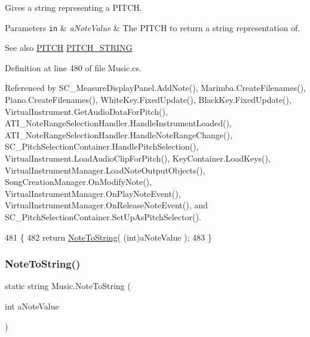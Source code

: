 Gives a string representing a P\+I\+T\+CH. 


\begin{DoxyParams}[1]{Parameters}
\mbox{\tt in}  & {\em a\+Note\+Value} & The P\+I\+T\+CH to return a string representation of.\\
\hline
\end{DoxyParams}
\begin{DoxySeeAlso}{See also}
\hyperlink{group___music_enums_ga508f69b199ea518f935486c990edac1d}{P\+I\+T\+CH} \hyperlink{group___music_constants_ga0f6eb5ac330d374c6b5021a0ba11c2bc}{P\+I\+T\+C\+H\+\_\+\+S\+T\+R\+I\+NG} 
\end{DoxySeeAlso}


Definition at line 480 of file Music.\+cs.



Referenced by S\+C\+\_\+\+Measure\+Display\+Panel.\+Add\+Note(), Marimba.\+Create\+Filenames(), Piano.\+Create\+Filenames(), White\+Key.\+Fixed\+Update(), Black\+Key.\+Fixed\+Update(), Virtual\+Instrument.\+Get\+Audio\+Data\+For\+Pitch(), A\+T\+I\+\_\+\+Note\+Range\+Selection\+Handler.\+Handle\+Instrument\+Loaded(), A\+T\+I\+\_\+\+Note\+Range\+Selection\+Handler.\+Handle\+Note\+Range\+Change(), S\+C\+\_\+\+Pitch\+Selection\+Container.\+Handle\+Pitch\+Selection(), Virtual\+Instrument.\+Load\+Audio\+Clip\+For\+Pitch(), Key\+Container.\+Load\+Keys(), Virtual\+Instrument\+Manager.\+Load\+Note\+Output\+Objects(), Song\+Creation\+Manager.\+On\+Modify\+Note(), Virtual\+Instrument\+Manager.\+On\+Play\+Note\+Event(), Virtual\+Instrument\+Manager.\+On\+Release\+Note\+Event(), and S\+C\+\_\+\+Pitch\+Selection\+Container.\+Set\+Up\+As\+Pitch\+Selector().


\begin{DoxyCode}
481     \{
482         \textcolor{keywordflow}{return} \hyperlink{group___music_stat_func_ga85a22c905d56d4c5f4e62159bfecee8c}{NoteToString}( (\textcolor{keywordtype}{int})aNoteValue );
483     \}
\end{DoxyCode}
\mbox{\label{group___music_stat_func_ga03f793951dcfe199532c9596cb539022}} 
\subsubsection{\texorpdfstring{Note\+To\+String()}{NoteToString()}\hspace{0.1cm}{\footnotesize\ttfamily [2/2]}}
{\footnotesize\ttfamily static string Music.\+Note\+To\+String (\begin{DoxyParamCaption}\item[{int}]{a\+Note\+Value }\end{DoxyParamCaption})\hspace{0.3cm}{\ttfamily [static]}}



